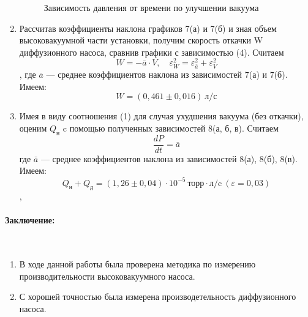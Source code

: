 \documentclass[a4paper, 12pt]{article}
\newcommand{\parag}[1]{\paragraph*{#1:}}
\begin{document}
\begin{enumerate}
	\begin{figure}[!h]
		\begin{center}
		\end{center}
		\caption{Зависимость давления от времени по улучшении вакуума}
	\end{figure}
	\item
	Рассчитав коэффициенты наклона графиков 7(а) и 7(б) и зная объем высоковакуумной части установки, получим скорость откачки W диффузионного насоса, сравнив графики с зависимостью (4). Считаем $$W = -\bar{a}\cdot V, \quad\varepsilon_W^2 = \varepsilon_{\bar{a}}^2 + \varepsilon_V^2$$,  где $\bar{a}$ --- среднее коэффициентов наклона из зависимостей 7(а) и 7(б). Имеем:
	$$W = (0,461\pm0,016) ~\text{л/с}$$
	\item
	Имея в виду соотношения (1) для случая ухудшения вакуума (без откачки), оценим $Q_\text{н}$ c помощью полученных зависимостей 8(а, б, в). Считаем $$\frac{dP}{dt} = \bar{a}$$ где $\bar{a}$ --- среднее коэффициентов наклона из зависимостей 8(а), 8(б), 8(в). Имеем:
	$$Q_\text{н} + Q_\text{д} = (1,26\pm0,04)\cdot 10^{-5} ~\text{торр}\cdot\text{л/c}~(\varepsilon = 0,03)$$, 

\end{enumerate}

\parag {Заключение} ~\\
\begin{enumerate}
	\item В ходе данной работы была проверена методика по измерению производительности высоковакуумного насоса.
	\item С хорошей точностью была измерена производетельность диффузионного насоса.
\end{enumerate}
\end{document}
